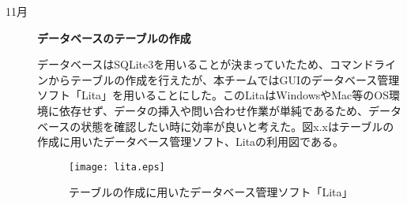 ﻿\begin{description}
 \item[11月] \textbf{データベースのテーブルの作成}\par
データベースはSQLite3を用いることが決まっていたため、コマンドラインからテーブルの作成を行えたが、本チームではGUIのデータベース管理ソフト「Lita」を用いることにした。このLitaはWindowsやMac等のOS環境に依存せず、データの挿入や問い合わせ作業が単純であるため、データベースの状態を確認したい時に効率が良いと考えた。図x.xはテーブルの作成に用いたデータベース管理ソフト、Litaの利用図である。

 \begin{figure}[h]
 \centering
 \texttt{[image: lita.eps]}
 \caption{テーブルの作成に用いたデータベース管理ソフト「Lita」}
 \label{fig:one}
 \end{figure}
 \par

\end{description}
